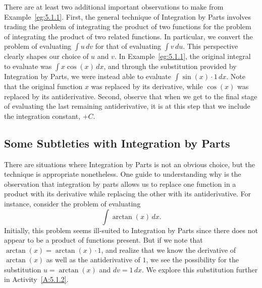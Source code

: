
There are at least two additional important observations to make from Example~\ref{eg:5.1.1}.  First, the general technique of Integration by Parts involves trading the problem of integrating the product of two functions for the problem of integrating the product of two related functions.  In particular, we convert the problem of evaluating $\int u \, dv$ for that of evaluating $\int v \, du$.  This perspective clearly shapes our choice of $u$ and $v$.  In  Example~\ref{eg:5.1.1}, the original integral to evaluate was $\int x \cos(x) \,dx$, and through the substitution provided by Integration by Parts, we were instead able to evaluate $\int \sin(x) \cdot 1 \, dx$.  Note that the original function $x$ was replaced by its derivative, while $\cos(x)$ was replaced by its antiderivative.  Second, observe that when we get to the final stage of evaluating the last remaining antiderivative, it is at this step that we include the integration constant, $+C$.  




\subsection*{Some Subtleties with Integration by Parts}

There are situations where Integration by Parts is not an obvious choice, but the technique is appropriate nonetheless.  One guide to understanding why is the observation that integration by parts allows us to replace one function in a product with its derivative while replacing the other with its antiderivative.  For instance, consider the problem of evaluating 
$$\int \arctan(x) \, dx.$$
Initially, this problem seems ill-suited to Integration by Parts since there does not appear to be a product of functions present.  But if we note that $\arctan(x) = \arctan(x) \cdot 1$, and realize that we know the derivative of $\arctan(x)$ as well as the antiderivative of $1$, we see the possibility for the substitution $u = \arctan(x)$ and $dv = 1 \, dx$.  We explore this substitution further in Activity~\ref{A:5.1.2}.

